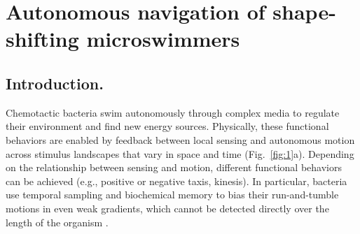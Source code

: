 \chapter{Autonomous navigation of shape-shifting microswimmers}
\section{Introduction.}
Chemotactic bacteria swim autonomously through complex media to regulate their environment and find new energy sources. Physically, these functional behaviors are enabled by feedback between local sensing and autonomous motion across stimulus landscapes that vary in space and time (Fig.\ \ref{fig:1}a). Depending on the relationship between sensing and motion, different functional behaviors can be achieved (e.g., positive or negative taxis, kinesis). In particular, bacteria use temporal sampling and biochemical memory to bias their run-and-tumble motions in even weak gradients, which cannot be detected directly over the length of the organism \cite{cates2012diffusive}.  

